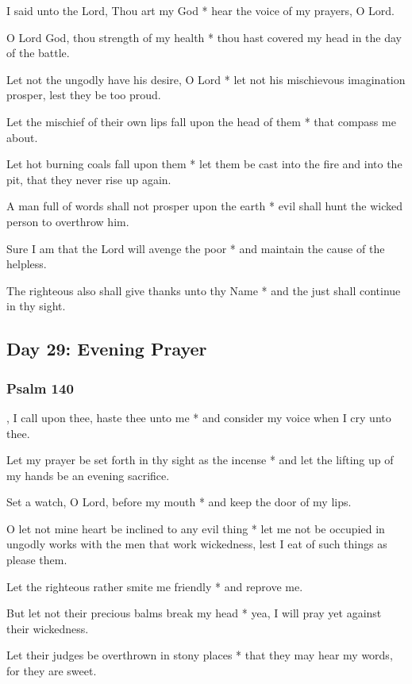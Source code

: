 I said unto the Lord, Thou art my God * hear the voice of my prayers, O Lord.

O Lord God, thou strength of my health * thou hast covered my head in the day of the battle.

Let not the ungodly have his desire, O Lord * let not his mischievous imagination prosper, lest they be too proud.

Let the mischief of their own lips fall upon the head of them * that compass me about.

Let hot burning coals fall upon them * let them be cast into the fire and into the pit, that they never rise up again.

A man full of words shall not prosper upon the earth * evil shall hunt the wicked person to overthrow him.

Sure I am that the Lord will avenge the poor * and maintain the cause of the helpless.

The righteous also shall give thanks unto thy Name * and the just shall continue in thy sight.

\subsection{Day 29: Evening Prayer}

\subsubsection{Psalm 140}


, I call upon thee, haste thee unto me * and consider my voice when I cry unto thee.

Let my prayer be set forth in thy sight as the incense * and let the lifting up of my hands be an evening sacrifice.

Set a watch, O Lord, before my mouth * and keep the door of my lips.

O let not mine heart be inclined to any evil thing * let me not be occupied in ungodly works with the men that work wickedness, lest I eat of such things as please them.

Let the righteous rather smite me friendly * and reprove me.

But let not their precious balms break my head * yea, I will pray yet against their wickedness.

Let their judges be overthrown in stony places * that they may hear my words, for they are sweet.

